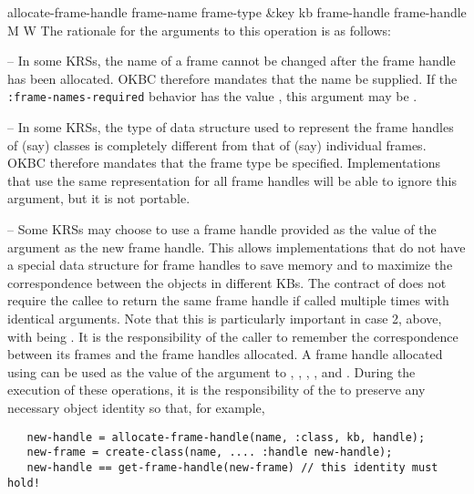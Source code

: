 \begin{okbcop}{allocate-frame-handle}{ frame-name frame-type \&key kb frame-handle} { frame-handle } { M } { W } {  }
   The rationale for the arguments to this operation is as follows:
   \bitem
   \item {} -- In some KRSs, the name of a frame cannot be
          changed after the frame handle has been allocated.  OKBC therefore
          mandates that the name be supplied.  If the
          {\tt :frame-names-required} behavior has the value \false,
          this argument may be \false.
   \item {} -- In some KRSs, the type of data structure used
          to represent the frame handles of (say) classes is completely
          different from that of (say) individual frames.  OKBC therefore
          mandates that the frame type be specified.  Implementations that use
          the same representation for all frame handles will be able to ignore
          this argument, but it is not portable.
   \item {} -- Some KRSs may choose to use a frame handle
          provided as the value of the  argument as the
          new frame handle.  This allows implementations that do not have a
          special data structure for frame handles to save memory and to
          maximize the correspondence between the objects in different KBs.
   \eitem
   The contract of  does not require the callee to
   return the same frame handle if called multiple times with identical
   arguments.  Note that this is particularly important in case 2, above,
   with  being \false.  It is the responsibility of
   the caller to remember the
   correspondence between its frames and the frame handles allocated.  A frame
   handle allocated using  can be used as the
   value of the  argument to ,
   , , , and
   .  During the execution of these operations, it is
   the responsibility of the  to preserve any necessary object
   identity so that, for example,
   \begin{verbatim}
   new-handle = allocate-frame-handle(name, :class, kb, handle);
   new-frame = create-class(name, .... :handle new-handle);
   new-handle == get-frame-handle(new-frame) // this identity must hold!
   \end{verbatim}
\end{okbcop}

